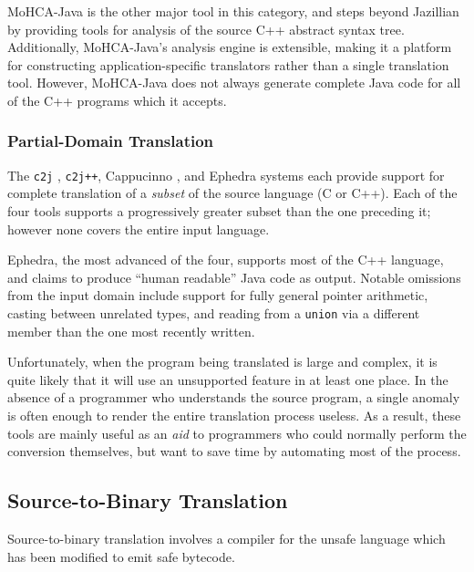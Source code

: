 \documentclass{acmconf}
\begin{document}
MoHCA-Java \cite{mohca} is the other major tool in this category, and
steps beyond Jazillian by providing tools for analysis of the source
C++ abstract syntax tree.  Additionally, MoHCA-Java's analysis engine
is extensible, making it a platform for constructing
application-specific translators rather than a single translation
tool.  However, MoHCA-Java does not always generate complete Java code
for all of the C++ programs which it accepts.

\subsubsection{Partial-Domain Translation}

The {\tt c2j} \cite{c2j}, {\tt c2j++}, Cappucinno
\cite{capp}, and Ephedra \cite{ephedra} systems each provide support
for complete translation of a {\it subset} of the source language (C
or C++).  Each of the four tools supports a progressively greater
subset than the one preceding it; however none covers the entire input
language.

Ephedra, the most advanced of the four, supports most of the C++
language, and claims to produce ``human readable'' Java code as
output.  Notable omissions from the input domain include support for
fully general pointer arithmetic, casting between unrelated types, and
reading from a {\tt union} via a different member than the one most
recently written.

Unfortunately, when the program being translated is large and complex,
it is quite likely that it will use an unsupported feature in at least
one place.  In the absence of a programmer who understands the source
program, a single anomaly is often enough to render the entire
translation process useless.  As a result, these tools are mainly
useful as an {\it aid} to programmers who could normally perform the
conversion themselves, but want to save time by automating most of the
process.


\subsection{Source-to-Binary Translation}

Source-to-binary translation involves a compiler for the unsafe
language which has been modified to emit safe bytecode.
\end{document}
